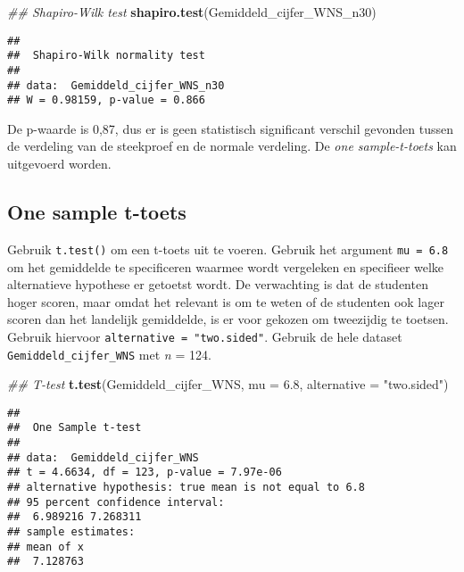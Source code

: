 \documentclass[
]{article}
\newenvironment{Shaded}{\begin{snugshade}}{\end{snugshade}}
\newcommand{\CommentTok}[1]{\textcolor[rgb]{0.56,0.35,0.01}{\textit{#1}}}
\newcommand{\DataTypeTok}[1]{\textcolor[rgb]{0.13,0.29,0.53}{#1}}
\newcommand{\FloatTok}[1]{\textcolor[rgb]{0.00,0.00,0.81}{#1}}
\newcommand{\KeywordTok}[1]{\textcolor[rgb]{0.13,0.29,0.53}{\textbf{#1}}}
\newcommand{\NormalTok}[1]{#1}
\newcommand{\StringTok}[1]{\textcolor[rgb]{0.31,0.60,0.02}{#1}}
\begin{document}
\begin{Shaded}
\begin{Highlighting}[]
\CommentTok{## Shapiro-Wilk test}
\KeywordTok{shapiro.test}\NormalTok{(Gemiddeld_cijfer_WNS_n30)}
\end{Highlighting}
\end{Shaded}

\begin{verbatim}
## 
##  Shapiro-Wilk normality test
## 
## data:  Gemiddeld_cijfer_WNS_n30
## W = 0.98159, p-value = 0.866
\end{verbatim}

De p-waarde is 0,87, dus er is geen statistisch significant verschil
gevonden tussen de verdeling van de steekproef en de normale verdeling.
De \emph{one sample-t-toets} kan uitgevoerd worden.

\hypertarget{one-sample-t-toets}{%
\subsection{One sample t-toets}\label{one-sample-t-toets}}

Gebruik \texttt{t.test()} om een t-toets uit te voeren. Gebruik het
argument \texttt{mu\ =\ 6.8} om het gemiddelde te specificeren waarmee
wordt vergeleken en specifieer welke alternatieve hypothese er getoetst
wordt. De verwachting is dat de studenten hoger scoren, maar omdat het
relevant is om te weten of de studenten ook lager scoren dan het
landelijk gemiddelde, is er voor gekozen om tweezijdig te toetsen.
Gebruik hiervoor \texttt{alternative\ =\ "two.sided"}. Gebruik de hele
dataset \texttt{Gemiddeld\_cijfer\_WNS} met \emph{n} = 124.

\begin{Shaded}
\begin{Highlighting}[]
\CommentTok{## T-test}
\KeywordTok{t.test}\NormalTok{(Gemiddeld_cijfer_WNS, }\DataTypeTok{mu =} \FloatTok{6.8}\NormalTok{, }\DataTypeTok{alternative =} \StringTok{"two.sided"}\NormalTok{)}
\end{Highlighting}
\end{Shaded}

\begin{verbatim}
## 
##  One Sample t-test
## 
## data:  Gemiddeld_cijfer_WNS
## t = 4.6634, df = 123, p-value = 7.97e-06
## alternative hypothesis: true mean is not equal to 6.8
## 95 percent confidence interval:
##  6.989216 7.268311
## sample estimates:
## mean of x 
##  7.128763
\end{verbatim}
\end{document}
